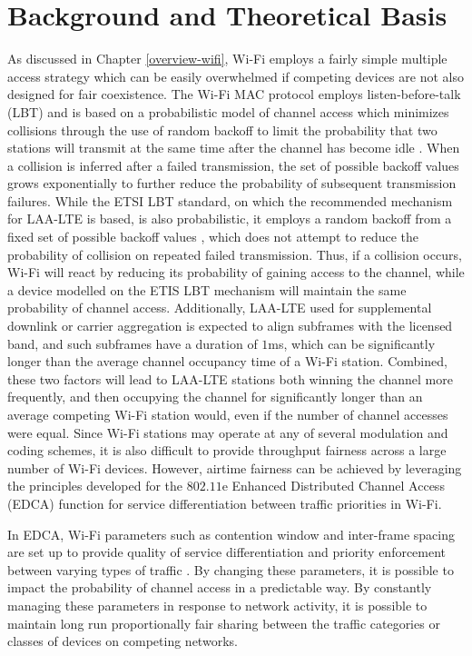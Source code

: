 \section{Background and Theoretical Basis}
\label{background}
As discussed in Chapter \ref{overview-wifi}, \mbox{\mbox{Wi-Fi}} employs a fairly simple multiple access strategy which can be easily overwhelmed if competing devices are not also designed for fair coexistence. The \mbox{\mbox{Wi-Fi}} MAC protocol employs listen-before-talk (LBT) and is based on a probabilistic model of channel access which minimizes collisions through the use of random backoff to limit the probability that two stations will transmit at the same time after the channel has become idle \cite{80211}.  When a collision is inferred after a failed transmission, the set of possible backoff values grows exponentially to further reduce the probability of subsequent transmission failures.  While the ETSI LBT standard, on which the recommended mechanism for \mbox{\mbox{LAA-LTE}} is based, is also probabilistic, it employs a random backoff from a fixed set of possible backoff values \cite{3gpp}, which does not attempt to reduce the probability of collision on repeated failed transmission.  Thus, if a collision occurs, \mbox{\mbox{Wi-Fi}} will react by reducing its probability of gaining access to the channel, while a device modelled on the ETIS LBT mechanism will maintain the same probability of channel access.  Additionally, \mbox{\mbox{LAA-LTE}} used for supplemental downlink or carrier aggregation is expected to align subframes with the licensed band, and such subframes have a duration of $1$ms, which can be significantly longer than the average channel occupancy time of a \mbox{Wi-Fi} station.  Combined, these two factors will lead to \mbox{\mbox{LAA-LTE}} stations both winning the channel more frequently, and then occupying the channel for significantly longer than an average competing \mbox{\mbox{Wi-Fi}} station would, even if the number of channel accesses were equal.  Since \mbox{\mbox{Wi-Fi}} stations may operate at any of several modulation and coding schemes, it is also difficult to provide throughput fairness across a large number of \mbox{Wi-Fi} devices. However, airtime fairness can be achieved by leveraging the principles developed for the $802.11$e Enhanced Distributed Channel Access (EDCA) function for service differentiation between traffic priorities in \mbox{Wi-Fi}.  

In EDCA, \mbox{\mbox{Wi-Fi}} parameters such as contention window and inter-frame spacing are set up to provide quality of service differentiation and priority enforcement between varying types of traffic \cite{80211}.  By changing these parameters, it is possible to impact the probability of channel access in a predictable way.  By constantly managing these parameters in response to network activity, it is possible to maintain long run proportionally fair sharing between the traffic categories or classes of devices on competing networks.  

